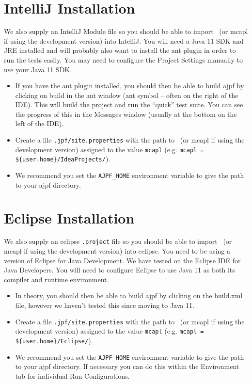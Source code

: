 \section{IntelliJ Installation}
We also supply an IntelliJ Module file so you should be able to import \ajpfversion\ (or mcapl if using the development version) into IntelliJ.  You will need a Java 11 SDK and JRE installed and will probably also want to install the ant plugin in order to run the tests easily.  You may need to configure the Project Settings manually to use your Java 11 SDK.
\begin{itemize}
\item If you have the ant plugin installed, you should then be able to build ajpf by clicking on build in the ant window (ant symbol -- often on the right of the IDE).  This will build the project and run the ``quick'' test suite.  You can see the progress of this in the Messages window (usually at the bottom on the left of the IDE).
\item Create a file \texttt{.jpf/site.properties} with the path to \ajpfversion\ (or mcapl if using the development version)  assigned to the value \texttt{mcapl} (e.g. \texttt{mcapl = \$\{user.home\}/IdeaProjects/\ajpfversion}).
\item We recommend you set the \texttt{AJPF\_HOME} environment variable to give the path to your ajpf directory.  
\end{itemize}

\section{Eclipse Installation}

We also supply an eclipse \texttt{.project} file so you should be able to import \ajpfversion\ (or mcapl if using the development version)  into eclipse.  You need to be using a version of Eclipse for Java Development.  We have tested on the Eclipse IDE for Java Developers.  You will need to configure Eclipse to use Java 11 as both its compiler and runtime environment. 
\begin{itemize}
\item In theory, you should then be able to build ajpf by clicking on the build.xml file, however we haven't tested this since moving to Java 11.
\item Create a file \texttt{.jpf/site.properties} with the path to \ajpfversion\ (or mcapl if using the development version)  assigned to the value \texttt{mcapl} (e.g. \texttt{mcapl = \$\{user.home\}/Eclipse/\ajpfversion}).
\item We recommend you set the \texttt{AJPF\_HOME} environment variable to give the path to your ajpf directory.  If necessary you can do this within the Environment tab for individual Run Configurations.
\end{itemize}

